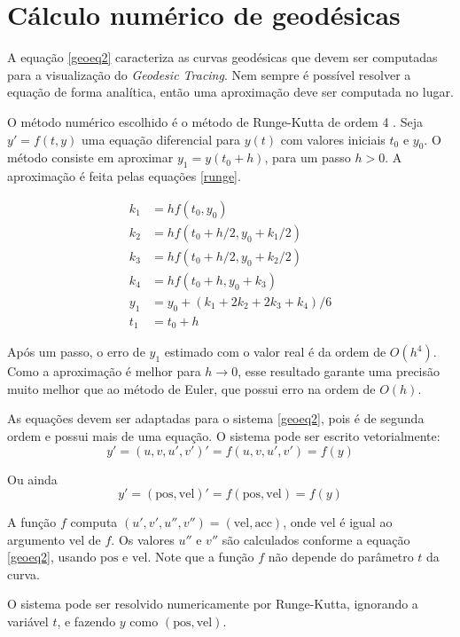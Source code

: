\chapter{Cálculo numérico de geodésicas}
\label{numeric}

A equação \ref{geoeq2} caracteriza as curvas geodésicas que devem ser 
computadas para a visualização do \textit{Geodesic Tracing}.
Nem sempre é possível resolver a equação de forma analítica, então uma aproximação
deve ser computada no lugar.

O método numérico escolhido é o método de Runge-Kutta de ordem 4 \cite{Anal:1}.
Seja $y' = f(t, y)$ uma equação diferencial para $y(t)$ com valores iniciais $t_0$ e $y_0$.
O método consiste em aproximar $y_1 = y(t_0+h)$, para um passo $h>0$.
A aproximação é feita pelas equações \ref{runge}.

\begin{equation}
\label{runge}
\begin{split}
k_1 & = hf(t_0, y_0) \\
k_2 & = hf(t_0 + h/2, y_0 + k_1/2) \\
k_3 & = hf(t_0 + h/2, y_0 + k_2/2) \\
k_4 & = hf(t_0 + h, y_0 + k_3) \\
y_1 & = y_0 + (k_1 + 2k_2 + 2k_3 + k_4)/6 \\
t_1 & = t_0 + h
\end{split}
\end{equation}

Após um passo, o erro de $y_1$ estimado com o valor real é da ordem de $O(h^4)$.
Como a aproximação é melhor para $h \rightarrow 0$, esse resultado garante uma precisão
muito melhor que ao método de Euler, que possui erro na ordem de $O(h)$.

As equações devem ser adaptadas para o sistema \ref{geoeq2}, pois é de 
segunda ordem e possui mais de uma equação.
O sistema pode ser escrito vetorialmente:
\[y' = (u, v, u', v')' = f(u, v, u', v') = f(y)\]

Ou ainda 
\[y' = (\text{pos}, \text{vel})' = f(\text{pos}, \text{vel}) = f(y)\]

A função $f$ computa $(u', v', u'', v'') = (\text{vel}, \text{acc})$, onde $\text{vel}$ é
igual ao argumento $\text{vel}$ de $f$. Os valores $u''$ e $v''$ são calculados conforme a equação
\ref{geoeq2}, usando $\text{pos}$ e $\text{vel}$.
Note que a função $f$ não depende do parâmetro $t$ da curva.

O sistema pode ser resolvido numericamente por Runge-Kutta, ignorando a variável $t$,
e fazendo $y$ como $(\text{pos}, \text{vel})$.

